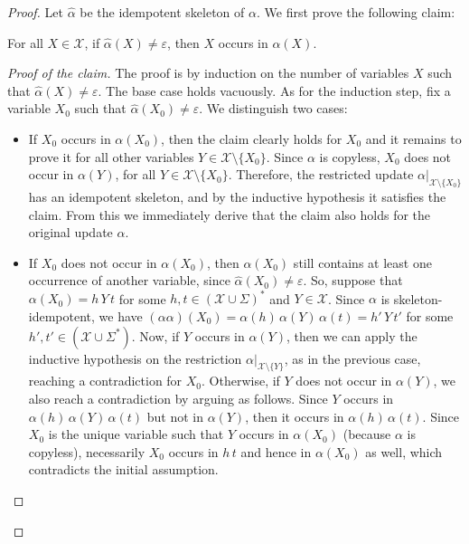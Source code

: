 \documentclass{article}
\newcommand{\var}{\mathcal{X}}
\begin{document}
\begin{proof}
    Let $\hat{\alpha}$ be the idempotent skeleton of $\alpha$. 
    We first prove the following claim:
    
    \begin{claim*}
    For all $X\in\var$, if $\hat\alpha(X) \neq \varepsilon$,
    then $X$ occurs in $\alpha(X)$.
    \end{claim*}


\begin{proof}[Proof of the claim]
The proof is by induction on the number of variables $X$
such that $\hat\alpha(X) \neq \varepsilon$.
The base case holds vacuously.
As for the induction step, fix a variable $X_0$ such that
$\hat\alpha(X_0) \neq \varepsilon$.
We distinguish two cases:
\begin{itemize}
\item If $X_0$ occurs in $\alpha(X_0)$, then the claim clearly holds for $X_0$
      and it remains to prove it for all other variables $Y\in\var\setminus\{X_0\}$.
      Since $\alpha$ is copyless,
      $X_0$ does not occur in $\alpha(Y)$, for all $Y\in\var\setminus\{X_0\}$.
      Therefore, the restricted update $\alpha|_{\var\setminus\{X_0\}}$ 
      has an idempotent skeleton, and by the inductive hypothesis 
      it satisfies the claim.
      From this we immediately derive that the claim also holds for the 
      original update $\alpha$.
\item If $X_0$ does not occur in $\alpha(X_0)$, then 
      $\alpha(X_0)$ still contains at least one occurrence of another variable,
      since $\hat\alpha(X_0) \neq \varepsilon$.
      So, suppose that $\alpha(X_0) = h\, Y \, t$ 
      for some $h,t\in (\var\cup\Sigma)^*$ and $Y\in\var$. 
      Since $\alpha$ is skeleton-idempotent, we have
      $(\alpha\alpha)(X_0) = \alpha(h) \, \alpha(Y) \, \alpha(t) = h'\, Y\, t'$
      for some $h',t'\in (\var\cup\Sigma^*)$. 
      Now, if $Y$ occurs in $\alpha(Y)$, then we can
      apply the inductive hypothesis on the restriction
      $\alpha|_{\var\setminus\{Y\}}$, as in the previous case,
      reaching a contradiction for $X_0$.
      Otherwise, if $Y$ does not occur in $\alpha(Y)$, we also reach
      a contradiction by arguing as follows.
      Since $Y$ occurs in $\alpha(h) \, \alpha(Y) \, \alpha(t)$
      but not in $\alpha(Y)$, then it occurs in $\alpha(h)\,\alpha(t)$. 
      Since $X_0$ is the unique variable such that $Y$ occurs in $\alpha(X_0)$ 
      (because $\alpha$ is copyless), necessarily $X_0$ occurs in $h\, t$ 
      and hence in $\alpha(X_0)$ as well, which contradicts the initial 
      assumption. 
      \qedhere
\end{itemize}
\end{proof}
   

\end{proof}
\end{document}
